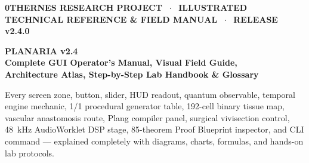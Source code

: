 \documentclass[10pt,letterpaper]{article}
\begin{document}
\begin{titlepage}
\thispagestyle{empty}

\vspace*{0.35cm}
{\sffamily\color{plnEmerald}\bfseries\small 0THERNES RESEARCH PROJECT $\;\cdot\;$ ILLUSTRATED TECHNICAL REFERENCE \& FIELD MANUAL $\;\cdot\;$ RELEASE v2.4.0}

\vspace{0.5cm}
{\sffamily\color{white}\Huge\bfseries PLANARIA v2.4}\\[0.25cm]
{\sffamily\color{white!88!cyan}\Large\bfseries Complete GUI Operator's Manual, Visual Field Guide,\\
Architecture Atlas, Step-by-Step Lab Handbook \& Glossary}

\vspace{0.5cm}
{\sffamily\color{white!82!gray}\normalsize
Every screen zone, button, slider, HUD readout, quantum observable, temporal engine mechanic, 1/1 procedural generator table, 192-cell binary tissue map, vascular anastomosis route, Plang compiler panel, surgical vivisection control, 48~kHz AudioWorklet DSP stage, 85-theorem Proof Blueprint inspector, and CLI command --- explained completely with diagrams, charts, formulas, and hands-on lab protocols.}

\vspace{1.25cm}


\end{titlepage}
\end{document}
